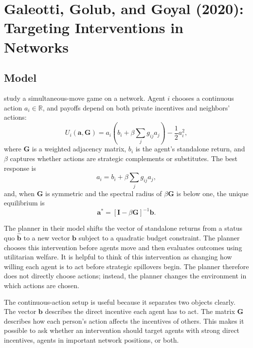 \documentclass[11pt,letterpaper]{article}
\begin{document}
\section{Galeotti, Golub, and Goyal (2020): Targeting Interventions in Networks}
\label{sec:ggg}

\subsection{Model}

\citet{galeotti2020} study a simultaneous-move game on a network. Agent $i$ chooses a continuous action $a_i \in \mathbb{R}$, and payoffs depend on both private incentives and neighbors' actions:
\begin{equation}
    U_i(\mathbf{a}, \mathbf{G}) = a_i \left( b_i + \beta \sum_j g_{ij} a_j \right) - \frac{1}{2} a_i^2,
    \label{eq:ggg-payoff}
\end{equation}
where $\mathbf{G}$ is a weighted adjacency matrix, $b_i$ is the agent's standalone return, and $\beta$ captures whether actions are strategic complements or substitutes. The best response is
\begin{equation}
    a_i = b_i + \beta \sum_j g_{ij} a_j,
    \label{eq:ggg-best-response}
\end{equation}
and, when $\mathbf{G}$ is symmetric and the spectral radius of $\beta \mathbf{G}$ is below one, the unique equilibrium is
\begin{equation}
    \mathbf{a}^* = [\mathbf{I} - \beta \mathbf{G}]^{-1} \mathbf{b}.
    \label{eq:ggg-equilibrium}
\end{equation}

The planner in their model shifts the vector of standalone returns from a status quo $\hat{\mathbf{b}}$ to a new vector $\mathbf{b}$ subject to a quadratic budget constraint. The planner chooses this intervention before agents move and then evaluates outcomes using utilitarian welfare. It is helpful to think of this intervention as changing how willing each agent is to act before strategic spillovers begin. The planner therefore does not directly choose actions; instead, the planner changes the environment in which actions are chosen.

The continuous-action setup is useful because it separates two objects clearly. The vector $\mathbf{b}$ describes the direct incentive each agent has to act. The matrix $\mathbf{G}$ describes how each person's action affects the incentives of others. This makes it possible to ask whether an intervention should target agents with strong direct incentives, agents in important network positions, or both.
\end{document}
